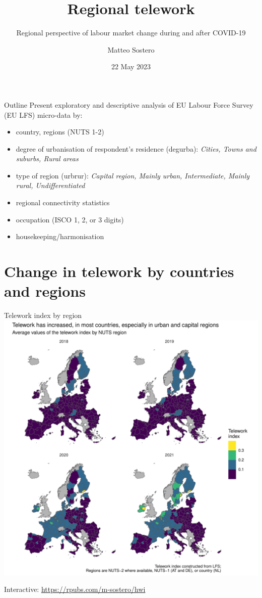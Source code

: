 \documentclass[10pt,handout]{beamer}
\title{Regional telework}
\subtitle{\small Regional perspective of labour market change during and after COVID-19}
\date{22 May 2023}
\author{Matteo Sostero}
\begin{document}
\maketitle

\begin{frame}{Outline}
Present exploratory and descriptive analysis of EU Labour Force Survey (EU LFS) micro-data by:
\begin{itemize}
  \item country, regions (NUTS 1-2)
  \item degree of urbanisation of respondent's residence (degurba): \emph{Cities, Towns and suburbs, Rural areas}
  \item type of region (urbrur): \emph{Capital region, Mainly urban, Intermediate, Mainly rural, Undifferentiated}
  \item regional connectivity statistics
  \item occupation (ISCO 1, 2, or 3 digits)
  \item housekeeping/harmonisation
\end{itemize}
\end{frame}

\section{Change in telework by countries and regions}

\begin{frame}{Telework index by region}
\centering
\includegraphics[width=\textwidth,height=0.85\textheight,keepaspectratio]{Telework_nuts_years.pdf}

Interactive: \url{https://rpubs.com/m-sostero/hwi}
\end{frame}
\end{document}
